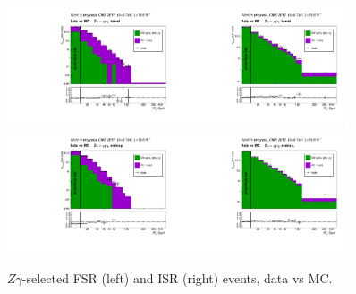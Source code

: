 \begin{figure}[htb]
  \begin{center}
   \includegraphics[width=0.45\textwidth]{../figs/figs_v11/MUON_ZGamma/PrepareYields/c_TotalDATAvsMC_Barrel__phoEtFSR.pdf}\includegraphics[width=0.45\textwidth]{../figs/figs_v11/MUON_ZGamma/PrepareYields/c_TotalDATAvsMC_Barrel__phoEtFSR_EXCLUDED.pdf}\\
   \includegraphics[width=0.45\textwidth]{../figs/figs_v11/MUON_ZGamma/PrepareYields/c_TotalDATAvsMC_Endcap__phoEtFSR.pdf}\includegraphics[width=0.45\textwidth]{../figs/figs_v11/MUON_ZGamma/PrepareYields/c_TotalDATAvsMC_Endcap__phoEtFSR_EXCLUDED.pdf}\\
  \caption{$Z\gamma$-selected FSR (left) and ISR (right) events, data vs MC.}
  \label{fig:Zg_ISRandFSR_phoEt}
  \end{center}
\end{figure}

